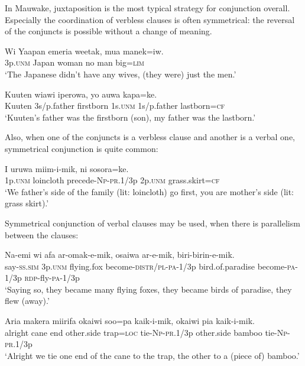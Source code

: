 In Mauwake, juxtaposition is the most typical strategy for conjunction overall. Especially the coordination of verbless clauses is often symmetrical: the reversal of the conjuncts is possible without a change of meaning. 

\ea%
\label{ex:8:x1367}
\gll Wi  Yaapan  emeria  weetak,  mua  manek=iw. \\
3p.\textsc{unm}  Japan  woman  no  man  big=\textsc{lim}\\
\glt `The Japanese didn't have any wives, (they were) just the men.'
\z


\ea%
\label{ex:8:x1390}
\gll Kuuten  wiawi  iperowa,  yo  auwa  kapa=ke. \\
Kuuten  3s/p.father  firstborn  1s.\textsc{unm}  1s/p.father  lastborn=\textsc{cf}      \\
\glt `Kuuten's father was the firstborn (son), my father was the lastborn.'
\z




Also, when one of the conjuncts is a verbless clause and another is a verbal one, symmetrical conjunction is quite common:

\ea%
\label{ex:8:x1391}
\gll I  uruwa  miim-i-mik,  ni  sosora=ke.\\
1p.\textsc{unm}  loincloth  precede-\textsc{Np}-\textsc{pr}.1/3p  2p.\textsc{unm}  grass.skirt=\textsc{cf}\\
\glt `We father's side of the family (lit: loincloth) go first, you are mother's side (lit: grass skirt).'
\z




Symmetrical conjunction of verbal clauses may be used, when there is parallelism between the clauses:

\ea%
\label{ex:8:x1368}
\gll Na-emi  wi  afa  ar-omak-e-mik, osaiwa  ar-e-mik,  biri-birin-e-mik.\\
say-\textsc{ss}.\textsc{sim}  3p.\textsc{unm}  flying.fox  become-\textsc{distr}/\textsc{pl}-\textsc{pa}-1/3p bird.of.paradise  become-\textsc{pa}-1/3p  \textsc{rdp}-fly-\textsc{pa}-1/3p\\
\glt `Saying so, they became many flying foxes, they became birds of paradise, they flew (away).'
\z

\ea%
\label{ex:8:x1392}
\gll Aria  makera  miirifa  okaiwi  soo=pa  kaik-i-mik, okaiwi  pia  kaik-i-mik.\\
alright  cane  end  other.side  trap=\textsc{loc}  tie-\textsc{Np}-\textsc{pr}.1/3p other.side  bamboo  tie-\textsc{Np}-\textsc{pr}.1/3p\\
\glt `Alright we tie one end of the cane to the trap, the other to a (piece of) bamboo.'
\z

